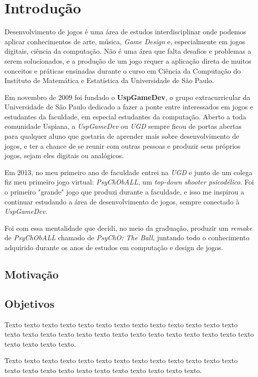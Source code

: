 \chapter{Introdução}
\label{cap:introducao}

    Desenvolvimento de jogos é uma área de estudos interdisciplinar onde podemos aplicar conhecimentos de arte, música, \textit{Game Design} e, especialmente em jogos digitais, ciência da computação. Não é uma área que falta desafios e problemas a serem solucionados, e a produção de um jogo requer a aplicação direta de muitos conceitos e práticas ensinadas durante o curso em Ciência da Computação do Instituto de Matemática e Estatística da Universidade de São Paulo.

    Em novembro de 2009 foi fundado o \textbf{UspGameDev}, o grupo extracurricular da Universidade de Sâo Paulo dedicado a fazer a ponte entre interessados em jogos e estudantes da faculdade, em especial estudantes da computação. Aberto a toda comunidade Uspiana, a \textit{UspGameDev} ou \textit{UGD} sempre ficou de portas abertas para qualquer aluno que gostaria de aprender mais sobre desenvolvimento de jogos, e ter a chance de se reunir com outras pessoas e produzir seus próprios jogos, sejam eles digitais ou analógicos.

    Em 2013, no meu primeiro ano de faculdade entrei na \textit{UGD} e junto de um colega fiz meu primeiro jogo virtual: \textit{PsyChObALL}, um \textit{top-down shooter psicodélico}. Foi o primeiro "grande" jogo que produzi durante a faculdade, e isso me inspirou a continuar estudando a área de desenvolvimento de jogos, sempre conectado à \textit{UspGameDev}.

    Foi com essa mentalidade que decidi, no meio da graduação, produzir um \textit{remake} de \textit{PsyChObALL} chamado de \textit{PsyChO: The Ball}, juntando todo o conhecimento adquirido durante os anos de estudos em computação e design de jogos.


\section{Motivação}
\label{sec:motivacao}

    


\section{Objetivos}
\label{sec:objetivo}

    Texto texto texto texto texto texto texto texto texto texto texto texto
    texto texto texto texto texto texto texto texto texto texto texto texto
    texto texto texto texto texto texto texto.

    Texto texto texto texto texto texto texto texto texto texto texto texto
    texto texto texto texto texto texto texto texto texto texto texto texto.
